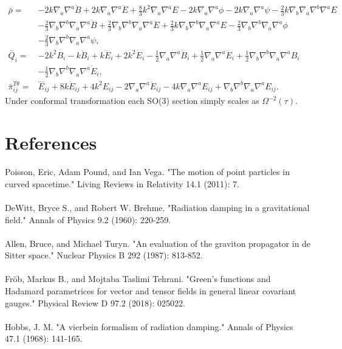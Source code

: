 \documentclass[10pt,letterpaper]{article}
\begin{document}
\begin{align}
\bar \rho={}&-2 k \nabla_{a}\nabla^{a}\dot{B}
 + 2 k \nabla_{a}\nabla^{a}\ddot{E}
 + \tfrac{8}{3} k^2 \nabla_{a}\nabla^{a}E
 - 2 k \nabla_{a}\nabla^{a}\phi
 - 2 k \nabla_{a}\nabla^{a}\psi
 -  \tfrac{2}{3} k \nabla_{b}\nabla_{a}\nabla^{b}\nabla^{a}E\nonumber\\
& -  \tfrac{2}{3} \nabla_{b}\nabla^{b}\nabla_{a}\nabla^{a}\dot{B}
 + \tfrac{2}{3} \nabla_{b}\nabla^{b}\nabla_{a}\nabla^{a}\ddot{E}
 + \tfrac{2}{3} k \nabla_{b}\nabla^{b}\nabla_{a}\nabla^{a}E
 -  \tfrac{2}{3} \nabla_{b}\nabla^{b}\nabla_{a}\nabla^{a}\phi\nonumber\\
& -  \tfrac{2}{3} \nabla_{b}\nabla^{b}\nabla_{a}\nabla^{a}\psi,
\nonumber\\
\bar Q_i={}& -2 k^2 B_{i}
 -  k \ddot{B}_{i}
 + k \dddot{E}_{i}
 + 2 k^2 \dot{E}_{i}
 -  \tfrac{1}{2} \nabla_{a}\nabla^{a}\ddot{B}_{i}
 + \tfrac{1}{2} \nabla_{a}\nabla^{a}\dddot{E}_{i}
 + \tfrac{1}{2} \nabla_{b}\nabla^{b}\nabla_{a}\nabla^{a}B_{i}\nonumber\\
& -  \tfrac{1}{2} \nabla_{b}\nabla^{b}\nabla_{a}\nabla^{a}\dot{E}_{i},
\nonumber\\
\bar \pi_{ij}^{T\theta}={}& \overset{\text{...}.}{E}_{ij}
 + 8 k \ddot{E}_{ij}
 + 4 k^2 E_{ij}
 - 2 \nabla_{a}\nabla^{a}\ddot{E}_{ij}
 - 4 k \nabla_{a}\nabla^{a}E_{ij}
 + \nabla_{b}\nabla^{b}\nabla_{a}\nabla^{a}E_{ij}.
\end{align}
Under conformal transformation each SO(3) section simply scales as $\Omega^{-2}(\tau)$. 
\newpage
\section*{References}
Poisson, Eric, Adam Pound, and Ian Vega. "The motion of point particles in curved spacetime." Living Reviews in Relativity 14.1 (2011): 7.\\ \\
DeWitt, Bryce S., and Robert W. Brehme. "Radiation damping in a gravitational field." Annals of Physics 9.2 (1960): 220-259.\\ \\
Allen, Bruce, and Michael Turyn. "An evaluation of the graviton propagator in de Sitter space." Nuclear Physics B 292 (1987): 813-852.\\ \\
Fröb, Markus B., and Mojtaba Taslimi Tehrani. "Green’s functions and Hadamard parametrices for vector and tensor fields in general linear covariant gauges." Physical Review D 97.2 (2018): 025022. \\ \\
Hobbs, J. M. "A vierbein formalism of radiation damping." Annals of Physics 47.1 (1968): 141-165.
\end{document}
